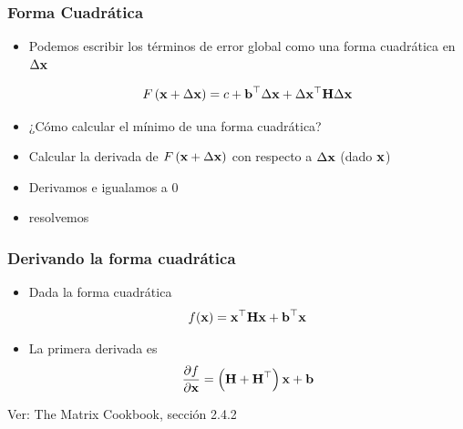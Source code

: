 \begin{frame}
    \frametitle{Forma Cuadrática}
    
    \begin{itemize}
        \item<1-> Podemos escribir los términos de error global como una forma cuadrática en $\Delta \boldsymbol{\mathbf{x}}$
        
        \begin{equation*}
            F\left(\boldsymbol{\mathbf{x}} + \Delta \boldsymbol{\mathbf{x}} \right) = c + \boldsymbol{\mathbf{b}}^{\top} \Delta \boldsymbol{\mathbf{x}} + \Delta \boldsymbol{\mathbf{x}}^{\top} \boldsymbol{\mathbf{H}} \Delta \boldsymbol{\mathbf{x}}
        \end{equation*}
        
        \item<1> \alert{¿Cómo calcular el mínimo de una forma cuadrática?}
        \item<2-> Calcular la derivada de  $F\left(\boldsymbol{\mathbf{x}} + \Delta \boldsymbol{\mathbf{x}} \right)$ con respecto a $\Delta \boldsymbol{\mathbf{x}}$ (dado $\boldsymbol{\mathbf{x}}$)
        \item<2-> Derivamos e igualamos a 0
        \item<2-> resolvemos
    \end{itemize}

\end{frame}

\begin{frame}
    \frametitle{Derivando la forma cuadrática}
    
    \begin{itemize}
        \item Dada la forma cuadrática
        \begin{equation*}
            f(\boldsymbol{\mathbf{x}}) = \boldsymbol{\mathbf{x}}^{\top} \boldsymbol{\mathbf{H}} \boldsymbol{\mathbf{x}} + \boldsymbol{\mathbf{b}}^{\top} \boldsymbol{\mathbf{x}}
        \end{equation*}
        \item La primera derivada es
        \begin{equation*}
            \dfrac{\partial f}{\partial \boldsymbol{\mathbf{x}}} = \left( \boldsymbol{\mathbf{H}} + \boldsymbol{\mathbf{H}}^{\top} \right) \boldsymbol{\mathbf{x}} + \boldsymbol{\mathbf{b}}
        \end{equation*}
    \end{itemize}
    
    Ver: The Matrix Cookbook, sección 2.4.2
   
\end{frame}

